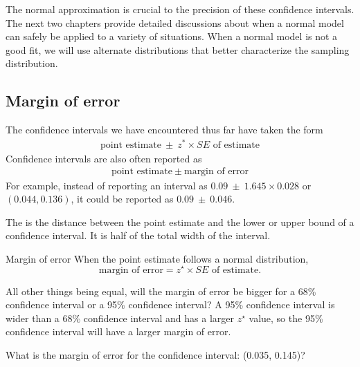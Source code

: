The normal approximation is crucial to the precision of these confidence intervals. The next two chapters provide detailed discussions about when a normal model can safely be applied to a variety of situations. When a normal model is not a good fit, we will use alternate distributions that better characterize the sampling distribution.

\subsection{Margin of error}

The confidence intervals we have encountered thus far have taken the form
\begin{align*}
\text{point estimate} \ \pm \ z^*\times SE \text{ of estimate}
\end{align*}
Confidence intervals are also often reported as 
\begin{align*}
\text{point estimate} \ \pm \ \text{margin of error}
\end{align*}
For example, instead of reporting an interval as $0.09 \ \pm  \ 1.645\times 0.028$ or $(0.044, 0.136)$, it could be reported as $0.09 \ \pm \  0.046$.

The  is the distance between the point estimate and the lower or upper bound of a confidence interval.  It is half of the total width of the interval.

\begin{onebox}{Margin of error}\label{marginOfErrorTermBox}
When the point estimate follows a normal distribution, 
$$ \text{margin of error} = z^{\star}\times SE \text{ of estimate}.$$
\end{onebox}

\begin{examplewrap}
\begin{nexample}{All other things being equal, will the margin of error be bigger for a 68\% confidence interval or a 95\% confidence interval?}
A 95\% confidence interval is wider than a 68\% confidence interval and has a larger $z^{\star}$ value, so the 95\% confidence interval will have a larger margin of error.
\end{nexample}
\end{examplewrap}

\begin{exercisewrap}
\begin{nexercise}What is the margin of error for the confidence interval: (0.035, 0.145)?\footnotemark
\end{nexercise}
\end{exercisewrap}

